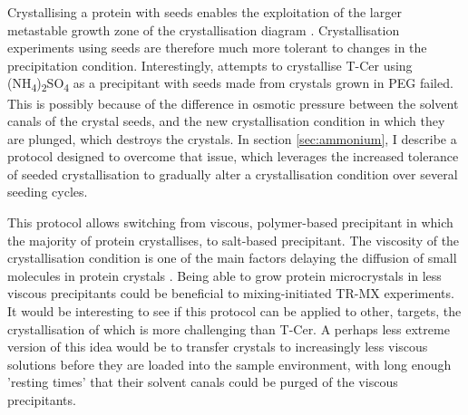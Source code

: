 Crystallising a protein with seeds enables the exploitation of the larger metastable growth zone of the crystallisation diagram \parencite{mcphersonCrystallizationProteinsPolyethylene1976, bergforsSeedsCrystals2003}. Crystallisation experiments using seeds are therefore much more tolerant to changes in the precipitation condition. Interestingly, attempts to crystallise T-Cer using (NH\textsubscript{4})\textsubscript{2}SO\textsubscript{4} as a precipitant with seeds made from crystals grown in PEG failed. This is possibly because of the difference in osmotic pressure between the solvent canals of the crystal seeds, and the new crystallisation condition in which they are plunged, which destroys the crystals. In section \ref{sec:ammonium}, I describe a protocol designed to overcome that issue, which leverages the increased tolerance of seeded crystallisation to gradually alter a crystallisation condition over several seeding cycles. 

This protocol allows switching from viscous, polymer-based precipitant in which the majority of protein crystallises, to salt-based precipitant. The viscosity of the crystallisation condition is one of the main factors delaying the diffusion of small molecules in protein crystals \parencite{makinenReactivityCryoenzymologyEnzymes1977}. Being able to grow protein microcrystals in less viscous precipitants could be beneficial to mixing-initiated TR-MX experiments. It would be interesting to see if this protocol can be applied to other, targets, the crystallisation of which is more challenging than T-Cer. 
\vspace{2mm}
A perhaps less extreme version of this idea would be to transfer crystals to increasingly less viscous solutions before they are loaded into the sample environment, with long enough 'resting times' that their solvent canals could be purged of the viscous precipitants.

